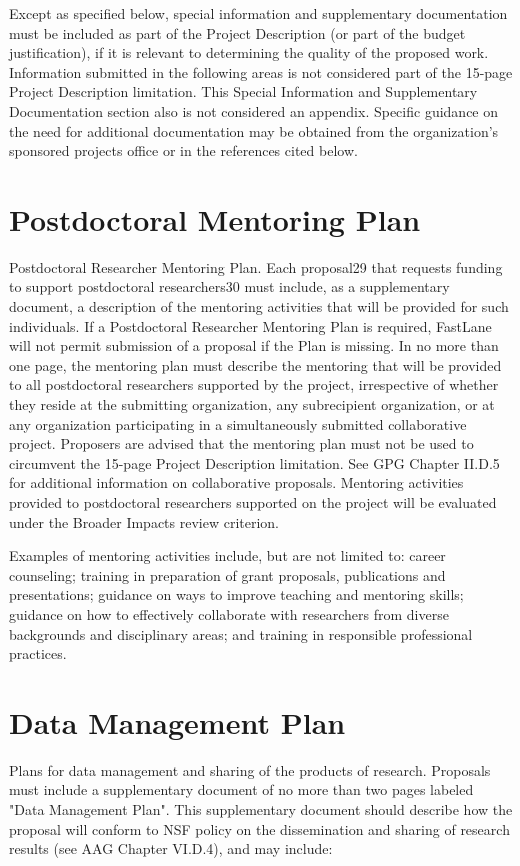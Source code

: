 Except as specified below, special information and supplementary
documentation must be included as part of the Project Description (or
part of the budget justification), if it is relevant to determining
the quality of the proposed work. Information submitted in the
following areas is not considered part of the 15-page Project
Description limitation. This Special Information and Supplementary
Documentation section also is not considered an appendix. Specific
guidance on the need for additional documentation may be obtained from
the organization's sponsored projects office or in the references
cited below.


\section*{Postdoctoral Mentoring Plan}
Postdoctoral Researcher Mentoring Plan. Each proposal29 that requests
funding to support postdoctoral researchers30 must include, as a
supplementary document, a description of the mentoring activities that
will be provided for such individuals. If a Postdoctoral Researcher
Mentoring Plan is required, FastLane will not permit submission of a
proposal if the Plan is missing. In no more than one page, the
mentoring plan must describe the mentoring that will be provided to
all postdoctoral researchers supported by the project, irrespective of
whether they reside at the submitting organization, any subrecipient
organization, or at any organization participating in a simultaneously
submitted collaborative project. Proposers are advised that the
mentoring plan must not be used to circumvent the 15-page Project
Description limitation. See GPG Chapter II.D.5 for additional
information on collaborative proposals. Mentoring activities provided
to postdoctoral researchers supported on the project will be evaluated
under the Broader Impacts review criterion.

Examples of mentoring activities include, but are not limited to:
career counseling; training in preparation of grant proposals,
publications and presentations; guidance on ways to improve teaching
and mentoring skills; guidance on how to effectively collaborate with
researchers from diverse backgrounds and disciplinary areas; and
training in responsible professional practices.


\section*{Data Management Plan}
Plans for data management and sharing of the products of
research. Proposals must include a supplementary document of no more
than two pages labeled "Data Management Plan". This supplementary
document should describe how the proposal will conform to NSF policy
on the dissemination and sharing of research results (see AAG Chapter
VI.D.4), and may include:

